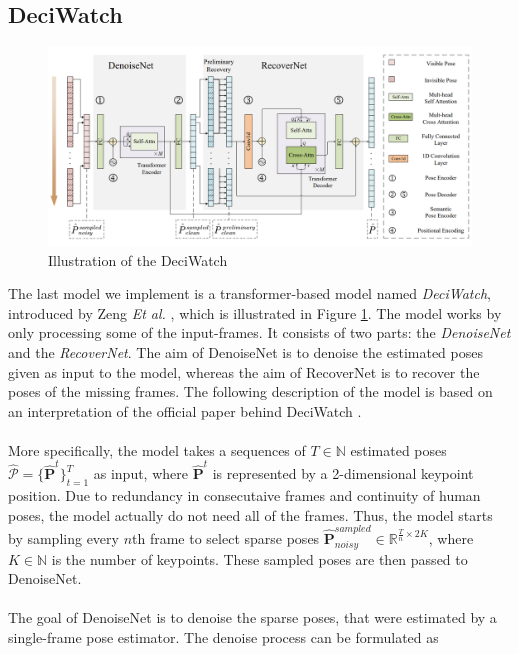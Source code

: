 \documentclass[./main.tex]{subfiles}
\begin{document}
\subsection{DeciWatch}
\label{sec:deciwatch}
\begin{figure}[htbp]
    \centering
    \includegraphics[width=\textwidth]{./entities/deciwatch.PNG}
    \caption{Illustration of the DeciWatch \cite{https://doi.org/10.48550/arxiv.2203.08713}}
    \label{fig:deciwatch}
\end{figure}
\noindent The last model we implement is a transformer-based model named \textit{DeciWatch}, introduced by Zeng \textit{Et al.} \cite{https://doi.org/10.48550/arxiv.2203.08713}, which is illustrated in Figure \ref{fig:deciwatch}. The model works by only processing some of the input-frames. It consists of two parts: the \textit{DenoiseNet} and the \textit{RecoverNet}. The aim of DenoiseNet is to denoise the estimated poses given as input to the model, whereas the aim of RecoverNet is to recover the poses of the missing frames. The following description of the model is based on an interpretation of the official paper behind DeciWatch \cite{https://doi.org/10.48550/arxiv.2203.08713}.
\\
\\
More specifically, the model takes a sequences of $T \in \mathbb{N}$ estimated poses $\hat{\mathcal{P}} = \{\hat{\bm{P}}^t\}_{t = 1} ^T$ as input, where $\hat{\bm{P}}^t$ is represented by a 2-dimensional keypoint position. Due to redundancy in consecutaive frames and continuity of human poses, the model actually do not need all of the frames. Thus, the model starts by sampling every $n$th frame to select sparse poses $\hat{\bm{P}}^{sampled} _{noisy} \in \mathbb{R}^{\frac{T}{n} \times 2K}$, where $K \in \mathbb{N}$ is the number of keypoints. These sampled poses are then passed to DenoiseNet.
\\
\\
The goal of DenoiseNet is to denoise the sparse poses, that were estimated by a single-frame pose estimator. The denoise process can be formulated as
\end{document}
